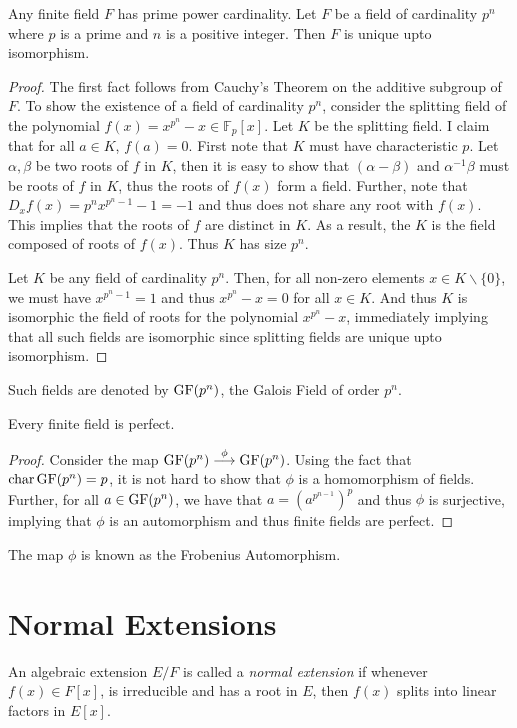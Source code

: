 \begin{theorem}
    Any finite field $F$ has prime power cardinality. Let $F$ be a field of cardinality $p^n$ where $p$ is a prime and $n$ is a positive integer. Then $F$ is unique upto isomorphism.
\end{theorem}
\begin{proof}
    The first fact follows from Cauchy's Theorem on the additive subgroup of $F$. To show the existence of a field of cardinality $p^n$, consider the splitting field of the polynomial $f(x) = x^{p^n} - x\in\mathbb{F}_p[x]$. Let $K$ be the splitting field. I claim that for all $a\in K$, $f(a) = 0$. First note that $K$ must have characteristic $p$. Let $\alpha,\beta$ be two roots of $f$ in $K$, then it is easy to show that $(\alpha - \beta)$ and $\alpha^{-1}\beta$ must be roots of $f$ in $K$, thus the roots of $f(x)$ form a field. Further, note that $D_x f(x) = p^nx^{p^n - 1} - 1 = -1$ and thus does not share any root with $f(x)$. This implies that the roots of $f$ are distinct in $K$. As a result, the $K$ is the field composed of roots of $f(x)$. Thus $K$ has size $p^n$.

    Let $K$ be any field of cardinality $p^n$. Then, for all non-zero elements $x\in K\backslash\{0\}$, we must have $x^{p^n - 1} = 1$ and thus $x^{p^n} - x = 0$ for all $x\in K$. And thus $K$ is isomorphic the field of roots for the polynomial $x^{p^n} - x$, immediately implying that all such fields are isomorphic since splitting fields are unique upto isomorphism.
\end{proof} 

Such fields are denoted by $\operatorname{GF}(p^n)$, the Galois Field of order $p^n$.

\begin{theorem}
    Every finite field is perfect.
\end{theorem}
\begin{proof}
    Consider the map $\operatorname{GF}(p^n)\stackrel{\phi}{\longrightarrow}\operatorname{GF}(p^n)$. Using the fact that $\operatorname{char}\operatorname{GF}(p^n) = p$, it is not hard to show that $\phi$ is a homomorphism of fields. Further, for all $a\in\operatorname{GF}(p^n)$, we have that $a = (a^{p^{n - 1}})^p$ and thus $\phi$ is surjective, implying that $\phi$ is an automorphism and thus finite fields are perfect.
\end{proof}

The map $\phi$ is known as the Frobenius Automorphism.

\section{Normal Extensions}
\begin{definition}
    An algebraic extension $E/F$ is called a \textit{normal extension} if whenever $f(x)\in F[x]$, is irreducible and has a root in $E$, then $f(x)$ splits into linear factors in $E[x]$.
\end{definition}

